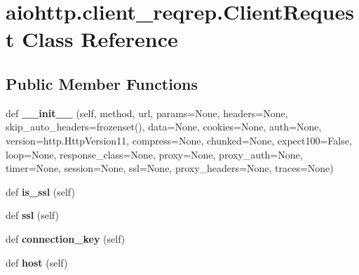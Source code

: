 \hypertarget{classaiohttp_1_1client__reqrep_1_1_client_request}{}\section{aiohttp.\+client\+\_\+reqrep.\+Client\+Request Class Reference}
\label{classaiohttp_1_1client__reqrep_1_1_client_request}
\subsection*{Public Member Functions}
\begin{DoxyCompactItemize}
\item 
\mbox{\label{classaiohttp_1_1client__reqrep_1_1_client_request_a1d07a8304d7f3b56d1230bdfcc1caa5f}} 
def {\bfseries \+\_\+\+\_\+init\+\_\+\+\_\+} (self, method, url, params=None, headers=None, skip\+\_\+auto\+\_\+headers=frozenset(), data=None, cookies=None, auth=None, version=http.\+Http\+Version11, compress=None, chunked=None, expect100=False, loop=None, response\+\_\+class=None, proxy=None, proxy\+\_\+auth=None, timer=None, session=None, ssl=None, proxy\+\_\+headers=None, traces=None)
\item 
\mbox{\label{classaiohttp_1_1client__reqrep_1_1_client_request_a8bf1ac7910b7077730af6112bcf08b37}} 
def {\bfseries is\+\_\+ssl} (self)
\item 
\mbox{\label{classaiohttp_1_1client__reqrep_1_1_client_request_a5f172f6940194068c038ad8adc38a8b4}} 
def {\bfseries ssl} (self)
\item 
\mbox{\label{classaiohttp_1_1client__reqrep_1_1_client_request_afef465c6f53e13797c3a7700bb2b775e}} 
def {\bfseries connection\+\_\+key} (self)
\item 
\mbox{\label{classaiohttp_1_1client__reqrep_1_1_client_request_a93e4f2d9b16b86e1fa72c982a5014176}} 
def {\bfseries host} (self)
\item 
\mbox{\label{classaiohttp_1_1client__reqrep_1_1_client_request_a811fc0aeb1cb135d8925a65add2594eb}} 

\end{DoxyCompactItemize}
